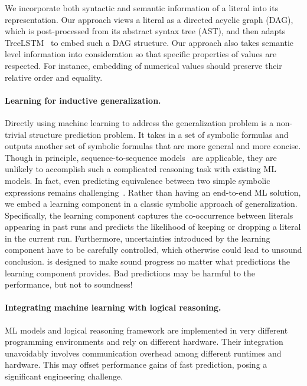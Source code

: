     
We incorporate both syntactic and semantic information of a literal into its
representation. Our approach views a literal as a directed acyclic graph (DAG),
which is post-processed from its abstract syntax tree (AST), and
then adapts TreeLSTM~\cite{TreeLSTM} to embed such a DAG structure. Our approach
also takes semantic level information into consideration so that specific
properties of values are respected. For instance, embedding of numerical
values should preserve their relative order and equality.
    



\paragraph{Learning for inductive generalization.}
Directly using machine learning to address the generalization problem
is a non-trivial structure prediction problem. It takes in a set of symbolic
formulas and outputs another set of symbolic formulas that are more
general and more concise. Though in principle, sequence-to-sequence
models~\cite{lample2019deep} are applicable, they are unlikely to accomplish such a
complicated reasoning task with existing ML models. In fact, even predicting
equivalence between two simple symbolic expressions remains
challenging~\cite{Allamanis:icml17}. Rather than having an end-to-end ML
solution, we embed a learning component in a classic symbolic approach of
generalization. Specifically, the learning component captures the
co-occurrence between literals appearing in past runs and predicts the likelihood
of keeping or dropping a literal in the current run.
Furthermore, uncertainties introduced by the learning component 
have to be carefully controlled, which otherwise could lead to
unsound conclusion. \dpy is designed to make sound progress no 
matter what predictions the learning component provides. Bad
predictions may be harmful to the performance, but not to soundness! 
   
    
\paragraph{Integrating machine learning with logical reasoning.}
ML models and logical reasoning framework are implemented in very different
programming environments and rely on different hardware. Their
integration unavoidably involves communication overhead among different runtimes and
hardware. This may offset performance gains of fast prediction, posing a significant engineering challenge. 
%


